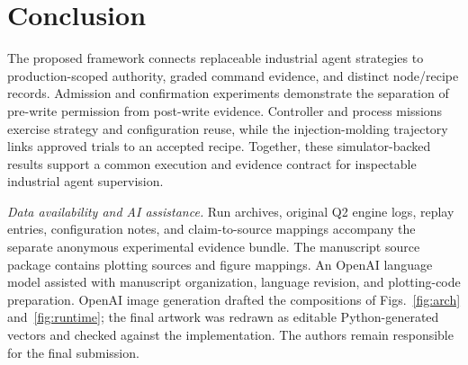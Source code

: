 \section{Conclusion}
\label{sec:conclusion}
The proposed framework connects replaceable industrial agent strategies
to production-scoped authority, graded command evidence, and distinct
node/recipe records. Admission and confirmation experiments demonstrate the
separation of pre-write permission from post-write evidence. Controller and
process missions exercise strategy and configuration reuse, while the
injection-molding trajectory links approved trials to an accepted recipe.
Together, these simulator-backed results support a common execution and
evidence contract for inspectable industrial agent supervision.

\noindent\textit{Data availability and AI assistance.}
Run archives, original Q2 engine logs, replay entries, configuration notes,
and claim-to-source mappings accompany the separate anonymous experimental
evidence bundle. The manuscript source package contains plotting sources
and figure mappings. An OpenAI language model assisted
with manuscript organization, language revision, and plotting-code
preparation. OpenAI image generation drafted the compositions of
Figs.~\ref{fig:arch} and~\ref{fig:runtime}; the final artwork was redrawn
as editable Python-generated vectors and checked against the implementation.
The authors remain responsible for the final submission.
